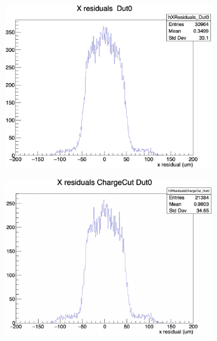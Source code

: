 \begin{figure}[H]
    \centering

    \begin{subfigure}[b]{0.3\textwidth}
        \includegraphics[width=\textwidth]{images/XRes_13planes.png}
        \caption{}
    \end{subfigure}
    \hfill
    \begin{subfigure}[b]{0.33\textwidth}
        \includegraphics[width=\textwidth]{images/XRes_4pixel.png}
        \caption{}
    \end{subfigure}
    \hfill
    \begin{subfigure}[b]{0.3\textwidth}

\end{subfigure}
\end{figure}
